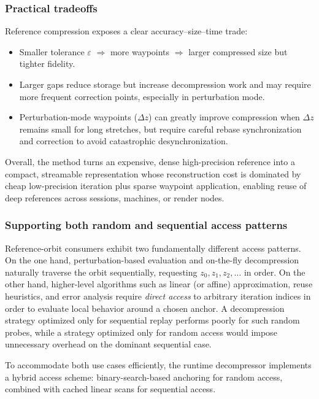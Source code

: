 \subsubsection{Practical tradeoffs}

Reference compression exposes a clear accuracy--size--time trade:
\begin{itemize}
  \item Smaller tolerance \(\varepsilon\) \(\Rightarrow\) more waypoints \(\Rightarrow\) larger compressed size but tighter fidelity.
  \item Larger gaps reduce storage but increase decompression work and may require more frequent correction points,
        especially in perturbation mode.
  \item Perturbation-mode waypoints (\(\Delta z\)) can greatly improve compression when \(\Delta z\) remains small for long
        stretches, but require careful rebase synchronization and correction to avoid catastrophic desynchronization.
\end{itemize}

Overall, the method turns an expensive, dense high-precision reference into a
compact, streamable representation whose reconstruction cost is dominated by
cheap low-precision iteration plus sparse waypoint application, enabling reuse
of deep references across sessions, machines, or render nodes.

\subsubsection{Supporting both random and sequential access patterns}
\label{sec:refcomp-runtime-access}

Reference-orbit consumers exhibit two fundamentally different access patterns.
On the one hand, perturbation-based evaluation and on-the-fly decompression
naturally traverse the orbit sequentially, requesting
\(z_0, z_1, z_2, \dots\) in order.  On the other hand, higher-level algorithms
such as linear (or affine) approximation, reuse heuristics, and error analysis
require \emph{direct access} to arbitrary iteration indices in order to evaluate
local behavior around a chosen anchor.  A decompression strategy optimized only
for sequential replay performs poorly for such random probes, while a strategy
optimized only for random access would impose unnecessary overhead on the
dominant sequential case.

To accommodate both use cases efficiently, the runtime decompressor implements a
hybrid access scheme: binary-search-based anchoring for random access, combined
with cached linear scans for sequential access.

